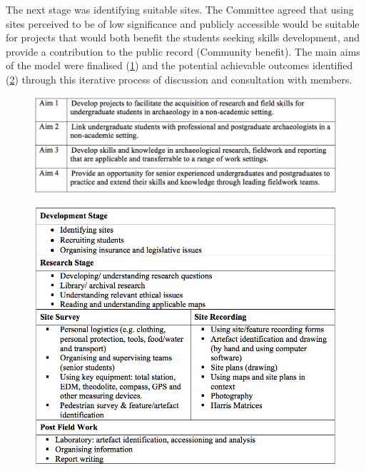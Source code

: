 \documentclass{ijsra}
\begin{document}
The next stage was identifying suitable sites. The Committee agreed that using sites perceived to be of low significance and publicly accessible would be suitable for projects that would both benefit the students seeking skills development, and provide a contribution to the public record (Community benefit). 
The main aims of the model were finalised (\cref{fig:Fyfe-Table01}) and the potential achievable outcomes identified (\cref{fig:Fyfe-Table02}) through this iterative process of discussion and consultation with members.

   	\begin{figure} %
   		\includegraphics[width=\linewidth]{figures/Fyfe-Table01}
   		\centering
   		\label{fig:Fyfe-Table01}
   	\end{figure}	

   	\begin{figure} %
   		\includegraphics[width=\linewidth]{figures/Fyfe-Table02}
   		\centering
   		\label{fig:Fyfe-Table02}
   	\end{figure}
\end{document}
